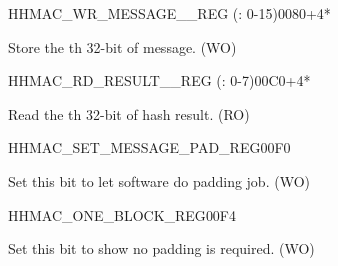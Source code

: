 \begin{register}{H}{HMAC\_WR\_MESSAGE\_\_REG (: 0-15)}{\hexprefix{}0080+4*}\label{regdesc:HMACWRMESSAGENREG}
%
\regnewline%
\begin{regdesc}\begin{reglist}
\label{fielddesc:HMACWDATAN}\item [HMAC\_WDATA\_\regindex{n}] Store the th 32-bit of message. (WO)
\end{reglist}\end{regdesc}
\end{register}


\begin{register}{H}{HMAC\_RD\_RESULT\_\_REG (: 0-7)}{\hexprefix{}00C0+4*}\label{regdesc:HMACRDRESULTNREG}
%
\regnewline%
\begin{regdesc}\begin{reglist}
\label{fielddesc:HMACRDATAN}\item [HMAC\_RDATA\_\regindex{n}] Read the th 32-bit of hash result. (RO)
\end{reglist}\end{regdesc}
\end{register}


\begin{register}{H}{HMAC\_SET\_MESSAGE\_PAD\_REG}{\hexprefix{}00F0}\label{regdesc:HMACSETMESSAGEPADREG}
%
%
\regnewline%
\begin{regdesc}\begin{reglist}
\label{fielddesc:HMACSETTEXTPAD}\item [HMAC\_SET\_TEXT\_PAD] Set this bit to let software do padding job. (WO)
\end{reglist}\end{regdesc}
\end{register}


\begin{register}{H}{HMAC\_ONE\_BLOCK\_REG}{\hexprefix{}00F4}\label{regdesc:HMACONEBLOCKREG}
%
%
\regnewline%
\begin{regdesc}\begin{reglist}
\label{fielddesc:HMACSETONEBLOCK}\item [HMAC\_SET\_ONE\_BLOCK] Set this bit to show no padding is required. (WO)
\end{reglist}\end{regdesc}
\end{register}



